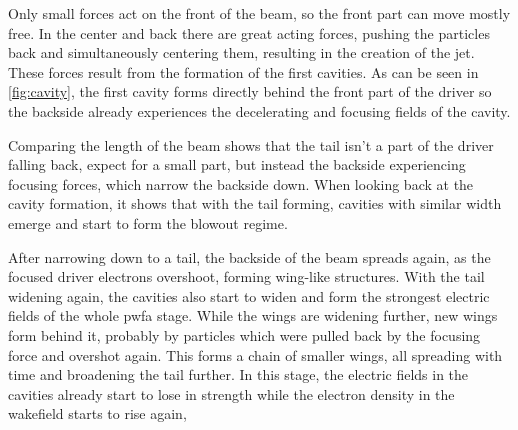 \documentclass[bachelor_thesis]{subfiles}
\begin{document}
Only small forces act on the front of the beam, so the front part can move mostly free. In the center and back there are great acting forces, pushing the particles back and simultaneously centering them, resulting in the creation of the jet.
These forces result from the formation of the first cavities. As can be seen in \autoref{fig:cavity}, the first cavity forms directly behind the front part of the driver so the backside already experiences the decelerating and focusing fields of the cavity.
\begin{figure}
	\centering
	\missingfigure{}
	\caption{}
	\label{fig:cavity}
\end{figure}
Comparing the length of the beam shows that the tail isn't a part of the driver falling back, expect for a small part, but instead the backside experiencing focusing forces, which narrow the backside down.
When looking back at the cavity formation, it shows that with the tail forming, cavities with similar width emerge and start to form the blowout regime.

After narrowing down to a tail, the backside of the beam spreads again, as the focused driver electrons overshoot, forming wing-like structures. With the tail widening again, the cavities also start to widen and form the strongest electric fields of the whole \gls{pwfa} stage.
While the wings are widening further, new wings form behind it, probably by particles which were pulled back by the focusing force and overshot again. This forms a chain of smaller wings, all spreading with time and broadening the tail further.
In this stage, the electric fields in the cavities already start to lose in strength while the electron density in the wakefield starts to rise again, 
\end{document}
